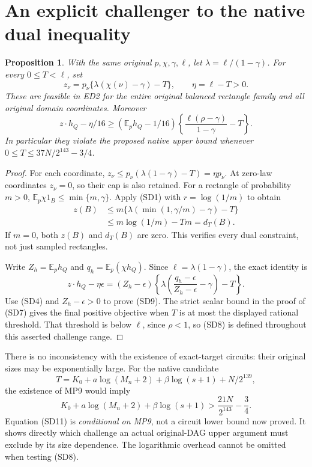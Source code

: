 \documentclass[11pt]{article}
\newtheorem{proposition}{Proposition}
\newcommand{\E}{\mathbb E}
\begin{document}
\section{An explicit challenger to the native dual inequality}
\begin{proposition}
With the same original $p,\chi,\gamma,\ell$, let
$\lambda=\ell/(1-\gamma)$. For every $0\le T<\ell$, set
\[
 z_\nu=p_\nu\{\lambda(\chi(\nu)-\gamma)-T\},
 \qquad \eta=\ell-T>0.                               \tag{SD8}
\]
These are feasible in ED2 for the entire original balanced
rectangle family and all original domain coordinates. Moreover
\[
 z\cdot h_Q-\eta/16
 \ge(\E_ph_Q-1/16)
          \left\{\frac{\ell(\rho-\gamma)}{1-\gamma}-T\right\}.
                                                               \tag{SD9}
\]
In particular they violate the proposed native upper bound whenever
$0\le T\le37N/2^{143}-3/4$.
\end{proposition}
\begin{proof}
For each coordinate,
$z_\nu\le p_\nu(\lambda(1-\gamma)-T)=\eta p_\nu$.
At zero-law coordinates $z_\nu=0$, so their cap is also retained.
For a rectangle of probability $m>0$,
$\E_p\chi1_B\le\min\{m,\gamma\}$.
Apply (SD1) with $r=\log(1/m)$ to obtain
\[
 \begin{split}
 z(B)
 &\le m\{\lambda(\min(1,\gamma/m)-\gamma)-T\}\\
 &\le m\log(1/m)-Tm=d_T(B).
 \end{split}
\]
If $m=0$, both $z(B)$ and $d_T(B)$ are zero.
This verifies every dual constraint, not just sampled rectangles.

Write $Z_h=\E_ph_Q$ and $q_h=\E_p(\chi h_Q)$.
Since $\ell=\lambda(1-\gamma)$, the exact identity is
\[
 z\cdot h_Q-\eta\epsilon
 =(Z_h-\epsilon)
   \left\{\lambda\left(\frac{q_h-\epsilon}{Z_h-\epsilon}
                                   -\gamma\right)-T\right\}.
                                                               \tag{SD10}
\]
Use (SD4) and $Z_h-\epsilon>0$ to prove (SD9).
The strict scalar bound in the proof of (SD7) gives the final
positive objective when $T$ is at most the displayed rational
threshold. That threshold is below $\ell$, since $\rho<1$,
so (SD8) is defined throughout this asserted challenge range.
\end{proof}

There is no inconsistency with the existence of exact-target
circuits: their original sizes may be exponentially large.
For the native candidate
\[
 T=K_0+a\log(M_n+2)+\beta\log(s+1)+N/2^{139},
\]
the existence of MP9 would imply
\[
 K_0+a\log(M_n+2)+\beta\log(s+1)
                    >\frac{21N}{2^{143}}-\frac34.    \tag{SD11}
\]
Equation (SD11) is \emph{conditional on MP9}, not a circuit lower
bound now proved. It shows directly which challenge an actual
original-DAG upper argument must exclude by its size dependence.
The logarithmic overhead cannot be omitted when testing (SD8).
\end{document}
